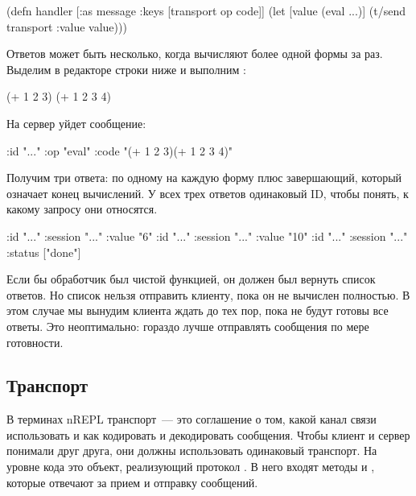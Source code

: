 \begin{english}
  \begin{clojure}
(defn handler [{:as message
                :keys [transport op code]}]
  (let [value (eval ...)]
    (t/send transport {:value value})))
  \end{clojure}
\end{english}

Ответов может быть несколько, когда вычисляют более одной формы за раз. Выделим в редакторе строки ниже и выполним :

\begin{english}
  \begin{clojure}
(+ 1 2 3)
(+ 1 2 3 4)
  \end{clojure}
\end{english}

На сервер уйдет сообщение:

\begin{english}
  \begin{clojure}
{:id "..." :op "eval" :code "(+ 1 2 3)(+ 1 2 3 4)"}
  \end{clojure}
\end{english}

Получим три ответа: по одному на каждую форму плюс завершающий, который означает конец вычислений. У всех трех ответов одинаковый ID, чтобы понять, к какому запросу они относятся.

\begin{english}
  \begin{clojure}
{:id "..." :session "..." :value "6"}
{:id "..." :session "..." :value "10"}
{:id "..." :session "..." :status ["done"]}
  \end{clojure}
\end{english}

Если бы обработчик был чистой функцией, он должен был вернуть список ответов. Но список нельзя отправить клиенту, пока он не вычислен полностью. В этом случае мы вынудим клиента ждать до тех пор, пока не будут готовы все ответы. Это неоптимально: гораздо лучше отправлять сообщения по мере готовности.

\subsection{Транспорт}

В терминах nREPL транспорт~--- это соглашение о том, какой канал связи использовать и как кодировать и декодировать сообщения. Чтобы клиент и сервер понимали друг друга, они должны использовать одинаковый транспорт. На уровне кода это объект, реализующий протокол . В него входят методы  и , которые отвечают за прием и отправку сообщений.

